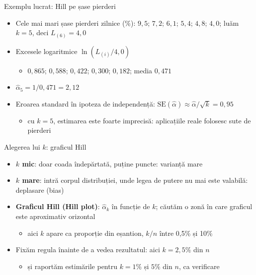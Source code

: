 \begin{frame}{Exemplu lucrat: Hill pe șase pierderi}
\itemsize{\small}
\begin{itemize}
    \item Cele mai mari șase pierderi zilnice (\%): $9{,}5$; $7{,}2$; $6{,}1$; $5{,}4$; $4{,}8$; $4{,}0$; luăm $k = 5$, deci $L_{(6)} = 4{,}0$
    \item Excesele logaritmice $\ln(L_{(i)}/4{,}0)$
    \begin{itemize}
        \item $0{,}865$; $0{,}588$; $0{,}422$; $0{,}300$; $0{,}182$; media $0{,}471$
    \end{itemize}
    \item $\hat\alpha_5 = 1/0{,}471 = 2{,}12$
    \item Eroarea standard în ipoteza de independență: $\mathrm{SE}(\hat\alpha) \approx \hat\alpha/\sqrt{k} = 0{,}95$
    \begin{itemize}
        \item cu $k = 5$, estimarea este foarte imprecisă: aplicațiile reale folosesc sute de pierderi
    \end{itemize}
\end{itemize}
\end{frame}

\begin{frame}{Alegerea lui $k$: graficul Hill}
\itemsize{\small}
\begin{itemize}
    \item \textbf{$k$ mic}: doar coada îndepărtată, puține puncte: varianță mare
    \item \textbf{$k$ mare}: intră corpul distribuției, unde legea de putere nu mai este valabilă: deplasare (bias)
    \item \textbf{Graficul Hill (Hill plot)}: $\hat\alpha_k$ în funcție de $k$; căutăm o zonă în care graficul este aproximativ orizontal 
    \begin{itemize}
        \item aici $k$ apare ca proporție din eșantion, $k/n$ între 0,5\% și 10\%
    \end{itemize}
    \item Fixăm regula înainte de a vedea rezultatul: aici $k = 2{,}5\%$ din $n$
    \begin{itemize}
        \item și raportăm estimările pentru $k = 1\%$ și $5\%$ din $n$, ca verificare
    \end{itemize}
\end{itemize}
\end{frame}

